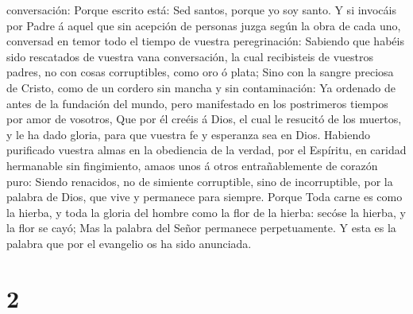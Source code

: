 conversación:  Porque escrito está: Sed santos, porque yo
soy santo.  Y si invocáis por Padre á aquel que sin
acepción de personas juzga según la obra de cada uno, conversad en temor
todo el tiempo de vuestra peregrinación:  Sabiendo que
habéis sido rescatados de vuestra vana conversación, la cual recibisteis
de vuestros padres, no con cosas corruptibles, como oro ó plata;
 Sino con la sangre preciosa de Cristo, como de un cordero
sin mancha y sin contaminación:  Ya ordenado de antes de la
fundación del mundo, pero manifestado en los postrimeros tiempos por
amor de vosotros,  Que por él creéis á Dios, el cual le
resucitó de los muertos, y le ha dado gloria, para que vuestra fe y
esperanza sea en Dios.  Habiendo purificado vuestra almas
en la obediencia de la verdad, por el Espíritu, en caridad hermanable
sin fingimiento, amaos unos á otros entrañablemente de corazón puro:
 Siendo renacidos, no de simiente corruptible, sino de
incorruptible, por la palabra de Dios, que vive y permanece para
siempre.  Porque Toda carne es como la hierba, y toda la
gloria del hombre como la flor de la hierba: secóse la hierba, y la flor
se cayó;  Mas la palabra del Señor permanece perpetuamente.
Y esta es la palabra que por el evangelio os ha sido anunciada.

\hypertarget{section-1}{%
\section{2}\label{section-1}}

